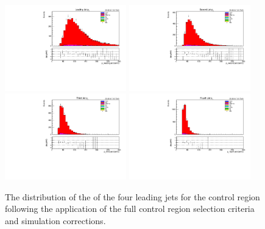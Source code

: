 \begin{figure}[tbp]
\centering
\includegraphics[width=0.47\textwidth]{figs/background-estimation/plots/unblinded/ttbar_control/leadJetPt_wMass.pdf}
\includegraphics[width=0.47\textwidth]{figs/background-estimation/plots/unblinded/ttbar_control/secondJetPt_wMass.pdf}
\\
\includegraphics[width=0.47\textwidth]{figs/background-estimation/plots/unblinded/ttbar_control/thirdJetPt_wMass.pdf}
\includegraphics[width=0.47\textwidth]{figs/background-estimation/plots/unblinded/ttbar_control/fourthJetPt_wMass.pdf}
\caption{
The distribution of the \pt of the four leading jets for the \ttbar control region following the application of the full control region selection criteria and simulation corrections.
}
\label{fig:ttbarCR_jetPt}
\end{figure}

